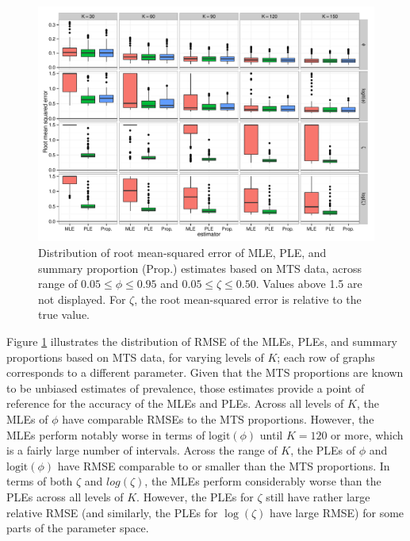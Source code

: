 \documentclass[man, noextraspace, floatsintext]{apa6}\usepackage[]{graphicx}\usepackage[]{color}
\makeatletter
\def\maxwidth{ %
  \ifdim\Gin@nat@width>\linewidth
    \linewidth
  \else
    \Gin@nat@width
  \fi
}
\newenvironment{knitrout}{}{} %
\newcommand{\logit}{\text{logit}}
\makeatother
\begin{document}
\begin{knitrout}
\color{fgcolor}\begin{figure}[tb]


{\centering \includegraphics[width=\maxwidth]{fig/MTS_RMSE} 

}

\caption[Distribution of root mean-squared error of MLE, PLE, and summary proportion (Prop]{Distribution of root mean-squared error of MLE, PLE, and summary proportion (Prop.) estimates based on MTS data, across range of $0.05 \leq \phi \leq 0.95$ and $0.05 \leq \zeta \leq 0.50$. Values above 1.5 are not displayed. For $\zeta$, the root mean-squared error is relative to the true value.\label{fig:MTS_RMSE}}
\end{figure}


\end{knitrout}

Figure \ref{fig:MTS_RMSE} illustrates the distribution of RMSE of the MLEs, PLEs, and summary proportions based on MTS data, for varying levels of $K$; each row of graphs corresponds to a different parameter. 
Given that the MTS proportions are known to be unbiased estimates of prevalence, those estimates provide a point of reference for the accuracy of the MLEs and PLEs. 
Across all levels of $K$, the MLEs of $\phi$ have comparable RMSEs to the MTS proportions. 
However, the MLEs perform notably worse in terms of $\logit(\phi)$ until $K = 120$ or more, which is a fairly large number of intervals.
Across the range of $K$, the PLEs of $\phi$ and $\logit(\phi)$ have RMSE comparable to or smaller than the MTS proportions. 
In terms of both $\zeta$ and $log(\zeta)$, the MLEs perform considerably worse than the PLEs across all levels of $K$. 
However, the PLEs for $\zeta$ still have rather large relative RMSE (and similarly, the PLEs for $\log(\zeta)$ have large RMSE) for some parts of the parameter space. 
\end{document}
